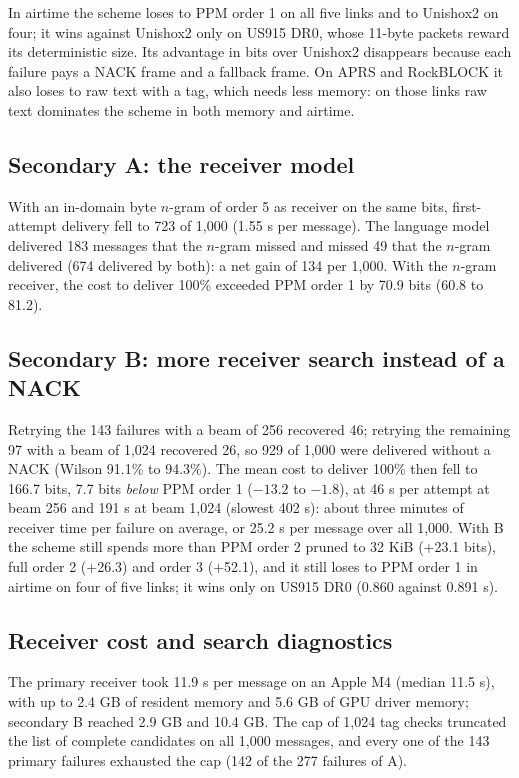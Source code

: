 \documentclass[11pt]{article}
\begin{document}
In airtime the scheme loses to PPM order 1 on all five links and to Unishox2 on four; it wins against
Unishox2 only on US915 DR0, whose 11-byte packets reward its deterministic size. Its advantage in bits
over Unishox2 disappears because each failure pays a NACK frame and a fallback frame. On APRS and
RockBLOCK it also loses to raw text with a tag, which needs less memory: on those links raw text
dominates the scheme in both memory and airtime.

\subsection{Secondary A: the receiver model}

With an in-domain byte $n$-gram of order 5 as receiver on the same bits, first-attempt delivery fell to
723 of 1,000 (1.55 s per message). The language model delivered 183 messages that the $n$-gram missed
and missed 49 that the $n$-gram delivered (674 delivered by both): a net gain of 134 per 1,000. With
the $n$-gram receiver, the cost to deliver 100\% exceeded PPM order 1 by 70.9 bits (60.8 to 81.2).

\subsection{Secondary B: more receiver search instead of a NACK}

Retrying the 143 failures with a beam of 256 recovered 46; retrying the remaining 97 with a beam of
1,024 recovered 26, so 929 of 1,000 were delivered without a NACK (Wilson 91.1\% to 94.3\%). The mean
cost to deliver 100\% then fell to 166.7 bits, 7.7 bits \emph{below} PPM order 1 ($-13.2$ to $-1.8$),
at 46 s per attempt at beam 256 and 191 s at beam 1,024 (slowest 402 s): about three minutes of
receiver time per failure on average, or 25.2 s per message over all 1,000. With B the scheme still
spends more than PPM order 2 pruned to 32 KiB (+23.1 bits), full order 2 (+26.3) and order 3 (+52.1),
and it still loses to PPM order 1 in airtime on four of five links; it wins only on US915 DR0 (0.860
against 0.891 s).

\subsection{Receiver cost and search diagnostics}

The primary receiver took 11.9 s per message on an Apple M4 (median 11.5 s), with up to 2.4 GB of
resident memory and 5.6 GB of GPU driver memory; secondary B reached 2.9 GB and 10.4 GB. The cap of
1,024 tag checks truncated the list of complete candidates on all 1,000 messages, and every one of the
143 primary failures exhausted the cap (142 of the 277 failures of A).
\end{document}
